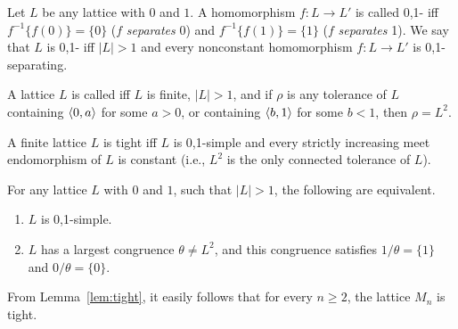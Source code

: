 Let $L$ be any lattice with $0$ and $1$. 
A homomorphism $f: L\to L'$
is called 0,1- iff $f^{-1}\{f(0)\} = \{0\}$ ($f$ \emph{separates} 0) and 
$f^{-1}\{f(1)\}  = \{1\}$ ($f$ \emph{separates} 1). 
We say that $L$ is 0,1- iff $|L| > 1$ and every 
nonconstant homomorphism $f : L \to L'$ is 0,1-separating.

\begin{definition}
A lattice $L$ is called  iff $L$ is finite, 
$|L| > 1$, and if $\rho$ is any tolerance of $L$ containing $\langle0,a\rangle$ for some $a > 0$, 
or containing  $\langle b,1\rangle$ for some $b < 1$, then $\rho= L^2$.
\end{definition}

\begin{lemma}
\label{lem:tight}
A finite lattice $L$ is tight iff $L$ is 0,1-simple and every strictly 
increasing meet endomorphism of $L$ is constant (i.e., $L^2$ is the only 
connected tolerance of $L$).
\end{lemma}

\begin{lemma}
For any lattice $L$ with $0$ and $1$, such that $|L| > 1$, the following are
equivalent.
\begin{enumerate}
\item $L$ is 0,1-simple.
\item $L$ has a largest congruence $\theta \neq L^2$, and this congruence satisfies 
$1/\theta = \{1\}$ and $0/\theta = \{0\}$.
\end{enumerate}
\end{lemma}
From Lemma~\ref{lem:tight}, it easily follows that for every $n \geq 2$, the lattice 
$M_n$ is tight. 


